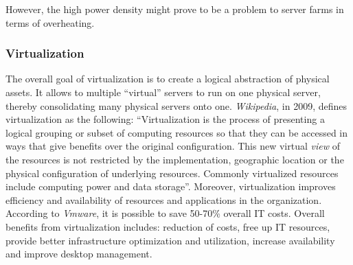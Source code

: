             However, the high power density might prove to be a problem to server farms in terms of overheating.%
            
            \subsubsection*{Virtualization}
                The overall goal of virtualization is to create a logical abstraction of physical assets. It allows to multiple ``virtual'' servers to run on one physical server, thereby consolidating many physical servers onto one. \emph{Wikipedia}, in 2009, defines virtualization as the following: ``Virtualization is the process of presenting a logical grouping or subset of computing resources so that they can be accessed in ways that give benefits over the original configuration. This new virtual \emph{view} of the resources is not restricted by the implementation, geographic location or the physical configuration of underlying resources. Commonly virtualized resources include computing power and data storage''. Moreover, virtualization improves efficiency and availability of resources and applications in the organization. According to \emph{Vmware}, it is possible to save 50-70\% overall IT costs. Overall benefits from virtualization includes: reduction of costs, free up IT resources, provide better infrastructure optimization and utilization, increase availability and improve desktop management.
                
